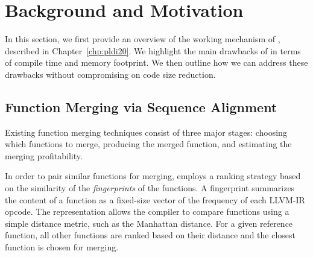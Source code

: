 \section{Background and Motivation} \label{sec:motivation}



In this section, we first provide an overview of the working mechanism of \SOAName, described in Chapter~\ref{chp:pldi20}. We highlight the main drawbacks of \SOAName in terms of compile time and memory footprint. We then outline how we can address these drawbacks without compromising on code size reduction. 

\subsection{Function Merging via Sequence Alignment}
Existing function merging techniques consist of three major stages: choosing which functions to merge, producing the merged function, and estimating the merging profitability.

In order to pair similar functions for merging, \SOAName employs a ranking strategy based on the similarity of the \textit{fingerprints} of the functions.
A fingerprint summarizes the content of a function as a fixed-size vector of the frequency of each LLVM-IR opcode. The representation allows the compiler to compare functions using a simple distance metric, such as the Manhattan distance. For a given reference function, all other functions are ranked based on their distance and the closest function is chosen for merging.

